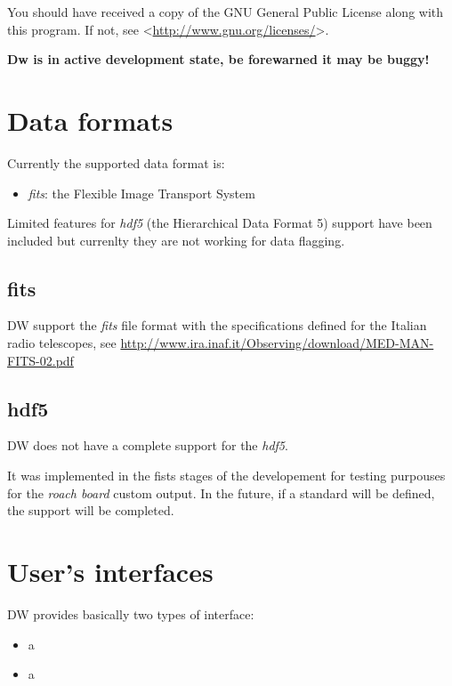 \documentclass[letterpaper,10pt,english]{sphinxmanual}
\begin{document}
You should have received a copy of the GNU General Public License
along with this program. If not, see \textless{}\url{http://www.gnu.org/licenses/}\textgreater{}.

\textbf{Dw is in active development state, be forewarned it may be buggy!}


\chapter{Data formats}
\label{data::doc}\label{data:http-www-gnu-org-licenses}\label{data:data-formats}
Currently the supported data format is:
\begin{itemize}
\item {} 
\emph{fits}: the Flexible Image Transport System

\end{itemize}

Limited features for \emph{hdf5} (the Hierarchical Data Format 5) support have been included but
currenlty they are not working for data flagging.


\section{fits}
\label{data:fits}
DW support the \emph{fits} file format with the specifications defined for the
Italian radio telescopes, see
\url{http://www.ira.inaf.it/Observing/download/MED-MAN-FITS-02.pdf}


\section{hdf5}
\label{data:hdf5}
DW does not have a complete support for the \emph{hdf5}.

It was implemented in the fists stages of the developement for testing purpouses for the \emph{roach board} custom output. In the future, if a standard will be defined, the support will be completed.


\chapter{User's interfaces}
\label{ui:user-s-interfaces}\label{ui::doc}
DW provides basically two types of interface:
\begin{itemize}
\item {} 
a {\hyperref[tui::doc]{}}

\item {} 
a {\hyperref[gui::doc]{}}

\end{itemize}
\end{document}
